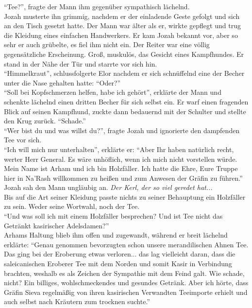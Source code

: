 ``Tee?'', fragte der Mann ihm gegenüber sympathisch lächelnd.\\
Jozah musterte ihn grimmig, nachdem er der einladende Geste gefolgt und sich an den Tisch gesetzt 
hatte. Der Mann war älter als er, wirkte gepflegt und trug die Kleidung eines einfachen 
Handwerkers. Er kam Jozah bekannt vor, aber so sehr er auch grübelte, es fiel ihm nicht ein. Der 
Reiter war eine völlig gegensätzliche Erscheinung. Groß, muskulös, das Gesicht eines Kampfhundes. 
Er stand in der Nähe der Tür und starrte vor sich hin.\\
``Himmelkraut'', schlussfolgerte Elor nachdem er sich schnüffelnd eine der Becher unter die Nase 
gehalten hatte: ``Oder?''\\
``Soll bei Kopfschmerzen helfen, habe ich gehört'', erklärte der Mann und schenkte lächelnd einen 
dritten Becher für sich selbst ein. Er warf einen fragenden Blick auf seinen Kampfhund, zuckte dann 
bedauernd mit der Schulter und stellte den Krug zurück. ``Schade.''\\
``Wer bist du und was willst du?'', fragte Jozah und ignorierte den dampfenden Tee vor sich.\\
``Ich will mich nur unterhalten'', erklärte er: ``Aber Ihr haben natürlich recht, werter Herr 
General. Es wäre unhöflich, wenn ich mich nicht vorstellen würde. Mein Name ist Arham und ich bin 
Holzfäller. Ich hatte die Ehre, Eure Truppe hier in Na'Rash willkommen zu heißen und zum Anwesen der Gräfin zu führen.''\\
Jozah sah den Mann ungläubig an. \textit{Der Kerl, der so viel geredet hat...}\\
Bis auf die Art seiner Kleidung passte nichts zu seiner Behauptung ein Holzfäller zu sein. Weder seine Wortwahl, noch der Tee.\\
``Und was soll ich mit einem Holzfäller besprechen? Und ist Tee nicht das Getränkt kasirischer 
Adelsdamen?''\\
Arhams Haltung blieb ihm offen und zugewandt, während er breit lächelnd erklärte: ``Genau genommen 
bevorzugten schon unsere merandilischen Ahnen Tee. Das ging bei der Eroberung etwas verloren... das 
lag vielleicht daran, dass die saleicanischen Eroberer Tee mit dem Norden und somit Kasir in 
Verbindung brachten, weshalb es als Zeichen der Sympathie mit dem Feind galt. Wie schade, nicht? 
Ein billiges, wohlschmeckendes und gesundes Getränk. Aber ich hörte, dass Gräfin Sieva regelmäßig 
von ihren kasirischen Verwandten Teeimporte erhielt und auch selbst nach Kräutern zum trocknen 
suchte.''\\

